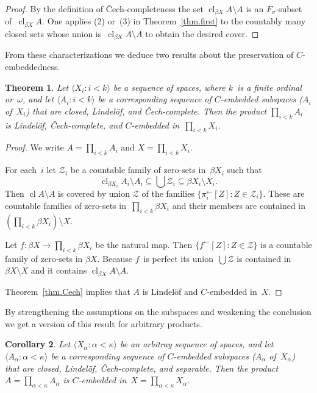 \documentclass[a4paper]{amsart}
\newcommand\calZ{\mathcal{Z}}
\newcommand\cl{\operatorname{cl}}
\newcommand\clbeta[1][X]{\cl_{\beta #1}}
\newcommand\preim{^\gets}
\theoremstyle{plain}
\newtheorem{theorem}{Theorem}[section]
\newtheorem{corollary}[theorem]{Corollary}
\theoremstyle{definition}
\theoremstyle{remark}
\begin{document}
\begin{proof}
By the definition of \v{C}ech-completeness
the set $\clbeta A\setminus A$ is an $F_\sigma$-subset of~$\clbeta A$.
One applies (2) or~(3) in Theorem~\ref{thm.first} to the countably many
closed sets whose union is~$\clbeta A\setminus A$ to obtain the desired
cover.
\end{proof}

From these characterizations we deduce two results about the preservation
of $C$-embeddedness.

\begin{theorem}\label{thm.product}
Let $\langle X_i:i<k\rangle$ be a sequence of spaces, 
where $k$~is a finite ordinal or~$\omega$, 
and let $\langle A_i:i<k\rangle$ be a corresponding sequence of 
$C$-embedded subspaces ($A_i$ of~$X_i$) that are closed, 
Lindel\"of, and \v{C}ech-complete.
Then the product $\prod_{i<k}A_i$ is 
Lindel\"of, \v{C}ech-complete, and $C$-embedded in~$\prod_{i<k}X_i$.
\end{theorem}

\begin{proof}
We write $A=\prod_{i<k}A_i$ and $X=\prod_{i<k}X_i$.

For each~$i$ let $\calZ_i$ be a countable family of zero-sets in~$\beta X_i$ 
such that
$$
\clbeta[X_i] A_i\setminus A_i
       \subseteq\bigcup\calZ_i\subseteq\beta X_i\setminus X_i.
$$
Then $\cl A\setminus A$ is covered by union $\calZ$ of the families
$\{\pi_i\preim[Z]:Z\in\calZ_i\}$.
These are countable families of zero-sets in~$\prod_{i<k}\beta X_i$
and their members are contained 
in $(\prod_{i<k}\beta X_i)\setminus X$.

Let $f:\beta X\to\prod_{i<k}\beta X_i$ be the natural map.
Then $\{f\preim[Z]:Z\in\calZ\}$ is a countable family of zero-sets 
in $\beta X$.
Because $f$~is perfect its union~$\bigcup\calZ$ is contained in
$\beta X\setminus X$ and it 
contains $\clbeta A\setminus A$.  

Theorem~\ref{thm.Cech} implies that $A$ is 
Lindel\"of and $C$-embedded in~$X$.
\end{proof}

By strengthening the assumptions on the subspaces and weakening the conclusion
we get a version of this result for arbitrary products.

\begin{corollary}
Let $\langle X_\alpha:\alpha<\kappa\rangle$ be an arbitray sequence of spaces, 
and let $\langle A_\alpha:\alpha<\kappa\rangle$ be a corresponding sequence of 
$C$-embedded subspaces ($A_\alpha$ of~$X_\alpha$) that are closed, 
Lindel\"of, \v{C}ech-complete, and separable.
Then the product $A=\prod_{\alpha<\kappa}A_\alpha$ is 
$C$-embedded in~$X=\prod_{\alpha<\kappa}X_\alpha$.
\end{corollary}
\end{document}
